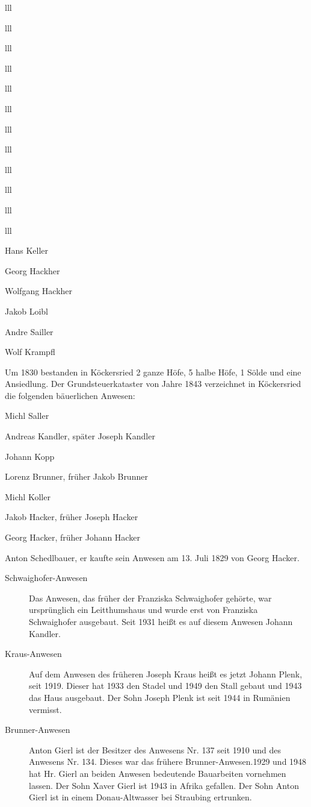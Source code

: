 \documentclass[12pt,a4pager]{book}
\begin{document}
\begin{tabuluar}{lll}
\begin{tabuluar}{lll}
\begin{tabuluar}{lll}
\begin{tabuluar}{lll}
\begin{tabuluar}{lll}
\begin{tabuluar}{lll}
\begin{tabuluar}{lll}
\begin{tabuluar}{lll}
\begin{tabuluar}{lll}
\begin{tabuluar}{lll}
\begin{tabuluar}{lll}
\begin{tabuluar}{lll}
\begin{compactitem}
\item Hans Keller
\item Georg Hackher
\item Wolfgang Hackher
\item Jakob Loibl
\item Andre Sailler
\item Wolf Krampfl
\end{compactitem}

Um 1830 bestanden in Köckersried 2 ganze Höfe, 5 halbe Höfe, 1 Sölde und eine
Ansiedlung. Der Grundsteuerkataster von Jahre 1843 verzeichnet in Köckersried
die folgenden bäuerlichen Anwesen:

\begin{compactitem}
\item Michl Saller
\item Andreas Kandler, später Joseph Kandler
\item Johann Kopp
\item Lorenz Brunner, früher Jakob Brunner
\item Michl Koller
\item Jakob Hacker, früher Joseph Hacker
\item Georg Hacker, früher Johann Hacker
\item Anton Schedlbauer, er kaufte sein Anwesen am 13. Juli 1829 von Georg Hacker.
\end{compactitem}

\begin{description}
\item[Schwaighofer-Anwesen] Das Anwesen, das früher der Franziska Schwaighofer
gehörte, war ursprünglich ein Leitthumshaus und wurde erst von Franziska
Schwaighofer ausgebaut. Seit 1931 heißt es auf diesem Anwesen Johann Kandler.

\item[Kraus-Anwesen] Auf dem Anwesen des früheren Joseph Kraus heißt es jetzt
Johann Plenk, seit 1919. Dieser hat 1933 den Stadel und 1949 den Stall gebaut
und 1943 das Haus ausgebaut. Der Sohn Joseph Plenk ist seit 1944 in Rumänien
vermisst.

\item[Brunner-Anwesen] Anton Gierl ist der Besitzer des Anwesens Nr. 137 seit
1910 und des Anwesens Nr. 134. Dieses war das frühere Brunner-Anwesen.1929 und
1948 hat Hr. Gierl an beiden Anwesen bedeutende Bauarbeiten vornehmen lassen.
Der Sohn Xaver Gierl ist 1943 in Afrika gefallen. Der Sohn Anton Gierl ist in
einem Donau-Altwasser bei Straubing ertrunken.


\end{description}
\end{tabuluar}
\end{tabuluar}
\end{tabuluar}
\end{tabuluar}
\end{tabuluar}
\end{tabuluar}
\end{tabuluar}
\end{tabuluar}
\end{tabuluar}
\end{tabuluar}
\end{tabuluar}
\end{tabuluar}
\end{document}
